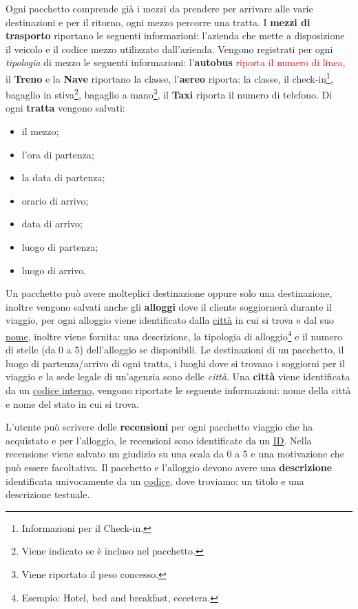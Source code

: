 %
%
Ogni pacchetto comprende già i mezzi da prendere per arrivare alle varie destinazioni e per il ritorno, ogni mezzo percorre una tratta. I \textbf{mezzi di trasporto} riportano le seguenti informazioni: l'azienda che mette a disposizione il veicolo e il codice mezzo utilizzato dall'azienda. Vengono registrati per ogni \emph{tipologia} di mezzo le seguenti informazioni:
l'\textbf{autobus} \textcolor{red}{riporta il numero di linea},
il \textbf{Treno} e la \textbf{Nave} riportano la classe,
l'\textbf{aereo} riporta:
la classe,
il check-in\footnote{Informazioni per il Check-in.},
bagaglio in stiva\footnote{Viene indicato se è incluso nel pacchetto.},
bagaglio a mano\footnote{Viene riportato il peso concesso.},
il \textbf{Taxi} riporta il numero di telefono.
%
%
Di ogni \textbf{tratta} vengono salvati:
\begin{multicols}{3}
    \begin{itemize}
        \item il mezzo;
        \item l'ora di partenza;
        \item la data di partenza;
        \item orario di arrivo;
        \item data di arrivo;
        \item luogo di partenza;
        \item luogo di arrivo.
    \end{itemize}
\end{multicols}

%
%
Un pacchetto può avere molteplici destinazione oppure solo una destinazione, inoltre vengono salvati anche gli \textbf{alloggi} dove il cliente soggiornerà durante il viaggio, per ogni alloggio viene identificato dalla \underline{città} in cui si trova e dal suo \underline{nome}, inoltre viene fornita: una descrizione, la tipologia di alloggio\footnote{Esempio: Hotel, bed and breakfast, eccetera.} e il numero di stelle (da 0 a 5) dell'alloggio se disponibili.
%
%
Le destinazioni di un pacchetto, il luogo di partenza/arrivo di ogni tratta, i luoghi dove si trovano i soggiorni per il viaggio e la sede legale di un'agenzia sono delle \emph{città}. Una \textbf{città} viene identificata da un \underline{codice interno}, vengono riportate le seguente informazioni: nome della città e nome del stato in cui si trova.

%
%
L'utente può scrivere delle \textbf{recensioni} per ogni pacchetto viaggio che ha acquistato e per l'alloggio, le recensioni sono identificate da un \underline{ID}. Nella recensione viene salvato un giudizio su una scala da 0 a 5 e una motivazione che può essere facoltativa.
%
%
Il pacchetto e l'alloggio devono avere una \textbf{descrizione} identificata univocamente da un \underline{codice}, dove troviamo: un titolo e una descrizione testuale.



